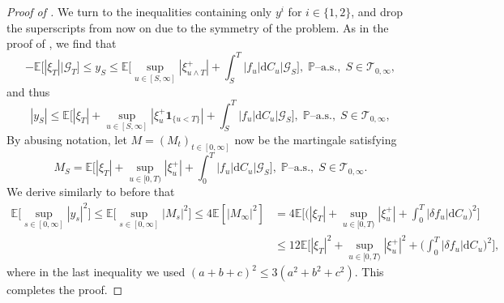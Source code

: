 \documentclass[10pt]{article} %
\newcommand\cG{\mathcal G}
\newcommand\cT{\mathcal T}
\def \E{\mathbb{E}}
\def \P{\mathbb{P}}
\def\d{\mathrm{d}}
\begin{document}
\begin{proof}[Proof of ]
	\medskip
	We turn to the inequalities containing only $y^i$ for $i \in \{1,2\}$, and drop the superscripts from now on due to the symmetry of the problem. As in the proof of , we find that
	\begin{equation*}
		-\E\big[ |\xi_T| \big| \cG_T\big] \leq y_S \leq \E\bigg[\sup_{u \in [S,\infty]}|\xi^+_{u \land T}| + \int_S^T |f_u|\d C_u \bigg| \cG_S\bigg], \; \text{$\P$--a.s.}, \; S \in \cT_{0,\infty},
	\end{equation*}
	and thus
	\begin{equation*}
		|y_S| \leq \E\bigg[|\xi_T| + \sup_{u \in [S,\infty]}|\xi^+_u \mathbf{1}_{\{u < T\}}| + \int_S^T |f_u|\d C_u \Bigg| \cG_S \bigg], \; \text{$\P$--a.s.}, \; S \in \cT_{0,\infty},
	\end{equation*}
	By abusing notation, let $M = (M_t)_{t \in [0,\infty]}$ now be the martingale satisfying
	\begin{equation*}
		M_S = \E\bigg[|\xi_T| + \sup_{u \in [0,T)}|\xi^+_{u}| + \int_0^T |f_u|\d C_u \bigg| \cG_S \bigg], \; \text{$\P$--a.s.}, \; S \in \cT_{0,\infty}.
	\end{equation*}
	We derive similarly to before that
	\begin{align*}
		\E\bigg[\sup_{s \in [0,\infty]} |y_s|^2\bigg] \leq \E\bigg[\sup_{s \in [0,\infty]} |M_s|^2\bigg] \leq 4  \E[|M_\infty|^2] &= 4  \E\bigg[ \bigg(|\xi_T| + \sup_{u \in [0,T)}|\xi^+_u| + \int_0^T |\delta f_u| \d C_u\bigg)^2 \bigg] \\
		&\leq 12  \E\bigg[ |\xi_T|^2 + \sup_{u \in [0,T)}|\xi^+_u|^2 + \bigg(\int_0^T |\delta f_u| \d C_u\bigg)^2 \bigg],
	\end{align*}
	where in the last inequality we used $(a+b+c)^2 \leq 3(a^2+b^2+c^2)$. This completes the proof.
\end{proof}
\end{document}

